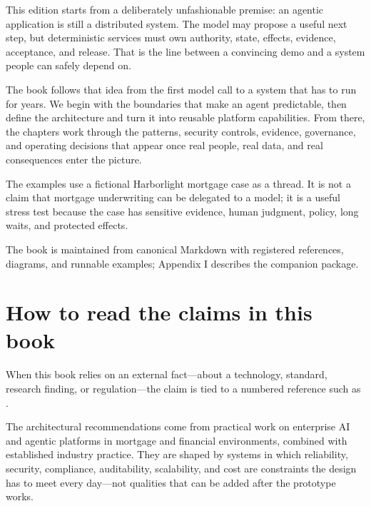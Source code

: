 
\frontmatter

\tableofcontents

\clearpage


This edition starts from a deliberately unfashionable premise: an agentic application is still a distributed system. The model may propose a useful next step, but deterministic services must own authority, state, effects, evidence, acceptance, and release. That is the line between a convincing demo and a system people can safely depend on.\par

The book follows that idea from the first model call to a system that has to run for years. We begin with the boundaries that make an agent predictable, then define the architecture and turn it into reusable platform capabilities. From there, the chapters work through the patterns, security controls, evidence, governance, and operating decisions that appear once real people, real data, and real consequences enter the picture.\par

The examples use a fictional Harborlight mortgage case as a thread. It is not a claim that mortgage underwriting can be delegated to a model; it is a useful stress test because the case has sensitive evidence, human judgment, policy, long waits, and protected effects.\par

The book is maintained from canonical Markdown with registered references, diagrams, and runnable examples; Appendix I describes the companion package.\par

\section{How to read the claims in this book}

When this book relies on an external fact—about a technology, standard, research finding, or regulation—the claim is tied to a numbered reference such as .\par

The architectural recommendations come from practical work on enterprise AI and agentic platforms in mortgage and financial environments, combined with established industry practice. They are shaped by systems in which reliability, security, compliance, auditability, scalability, and cost are constraints the design has to meet every day—not qualities that can be added after the prototype works.\par


